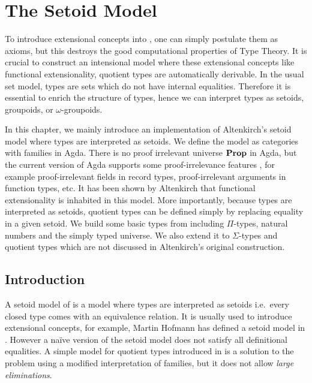 

\chapter{The Setoid Model}\label{models}


To introduce extensional concepts into \itt, one can simply postulate them as axioms, but this destroys the good computational properties of Type Theory.  
It is crucial to construct an intensional model where these extensional concepts like functional extensionality, quotient types are automatically derivable. 
In the usual set model, types are sets which do not have internal equalities. 
Therefore it is essential to enrich the structure of types, hence we can interpret types as setoids, groupoids, or $\omega$-groupoids. 


In this chapter, we mainly introduce an implementation of Altenkirch's setoid model  \cite{alti:lics99}  where types are interpreted as setoids. We define the model as categories with families in Agda. 
There is no proof irrelevant universe $\operatorname{\mathbf{Prop}}$ in Agda, but the current version of Agda supports some proof-irrelevance features \cite{prAgda}, for example proof-irrelevant fields in record types, proof-irrelevant arguments in function types, etc. It has been shown by Altenkirch \cite{alti:lics99} that functional extensionality is inhabited in this model. More importantly, because types are interpreted as setoids, quotient types can be defined simply by replacing equality in a given setoid.
We build some basic types from \cite{alti:lics99} including $\Pi$-types, natural numbers and the simply typed universe. We also extend it to $\Sigma$-types and quotient types which are not discussed in Altenkirch's original construction.

\section{Introduction}\label{setoidmodel}


A setoid model of \itt is a model where types are interpreted as setoids i.e.\ every closed type comes with an equivalence relation. It is usually used to introduce extensional concepts, for example, Martin Hofmann has defined a setoid model in \cite{hof:phd}. However a naïve version of the setoid model does not satisfy all definitional equalities. 
A simple model for quotient types introduced in \cite{hof:95:sm} is a solution to the problem using a modified interpretation of families, but it does not allow \emph{large eliminations}.

